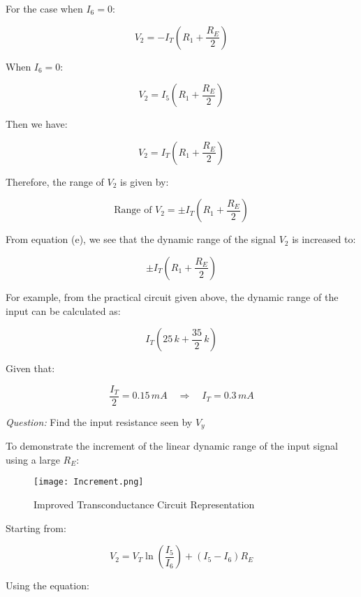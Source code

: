 \documentclass[a4paper,9pt,twoside,openany,twocolumn]{memoir}
\begin{document}
For the case when \( I_6 = 0 \):

\begin{equation}
V_2 = -I_T \left( R_1 + \frac{R_E}{2} \right) \tag{C}
\end{equation}

When \( I_6 = 0 \):

\begin{equation}
V_2 = I_5 \left( R_1 + \frac{R_E}{2} \right)
\end{equation}

Then we have:

\begin{equation}
V_2 = I_T \left( R_1 + \frac{R_E}{2} \right) \tag{d}
\end{equation}

Therefore, the range of \( V_2 \) is given by:

\begin{equation}
\text{Range of } V_2 = \pm I_T \left( R_1 + \frac{R_E}{2} \right) \tag{e}
\end{equation}

From equation (e), we see that the dynamic range of the signal \( V_2 \) is increased to:

\[
\pm I_T \left( R_1 + \frac{R_E}{2} \right)
\]

For example, from the practical circuit given above, the dynamic range of the input can be calculated as:

\[
I_T \left( 25\,k + \frac{35}{2}\,k \right)
\]

Given that:

\[
\frac{I_T}{2} = 0.15\,mA \quad \Rightarrow \quad I_T = 0.3\,mA
\]

\textit{Question:} Find the input resistance seen by \( V_y \)


To demonstrate the increment of the linear dynamic range of the input signal using a large \( R_E \):
\begin{figure}[h]
    \centering
    \texttt{[image: Increment.png]} %
    \caption{Improved Transconductance Circuit Representation}
    \label{fig:Practical}
\end{figure}


Starting from:

\begin{equation}
V_2 = V_T \ln \left( \frac{I_5}{I_6} \right) + (I_5 - I_6) R_E \tag{1}
\end{equation}

Using the equation:
\end{document}
